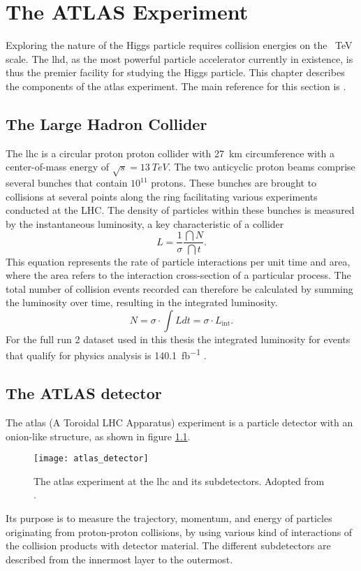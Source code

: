 \chapter{The ATLAS Experiment}\label{sec:atlas}
Exploring the nature of the Higgs particle requires collision energies on the \qty[]{}{TeV} scale. The \ac{lhd}, as the most powerful particle accelerator currently in existence, is thus the premier facility for studying the Higgs particle. This chapter describes the components of the \ac{atlas} experiment. The main reference for this section is \citep{aad2008atlas}.

\section{The Large Hadron Collider}
The \ac{lhc} is a circular proton proton collider with \qty[]{27}{km} circumference with a center-of-mass energy of $\sqrt{s}=\qty[]{13}{TeV}$. The two anticyclic proton beams comprise several bunches that contain $10^{11}$ protons. These bunches are brought to collisions at several points along the ring facilitating various experiments conducted at the LHC. The density of particles within these bunches is measured by the instantaneous luminosity, a key characteristic of a collider
\begin{equation}
    L=\frac{1}{\sigma}\frac{\dint{N}}{\dint{t}}.
\end{equation}
This equation represents the rate of particle interactions per unit time and area, where the area refers to the interaction cross-section of a particular process. The total number of collision events recorded can therefore be calculated by summing the luminosity over time, resulting in the integrated luminosity.
\begin{equation}
    N=\sigma\cdot\int L dt=\sigma\cdot L_\mathrm{int}.
\end{equation}
For the full run 2 dataset used in this thesis the integrated luminosity for events that qualify for physics analysis is \qty[]{140.1}{fb^{-1}} \citep{DAPR-2021-01}.

\section{The ATLAS detector}
The \ac{atlas} (A Toroidal LHC Apparatus) experiment is a particle detector with an onion-like structure, as shown in figure \ref{fig:atlas_detector}.
\begin{figure}
    \centering
    \texttt{[image: atlas\_detector]}
    \caption[]{The \ac{atlas} experiment at the \ac{lhc} and its subdetectors. Adopted from \citep{Pequenao:1095924}.}
    \label{fig:atlas_detector}
\end{figure}
Its purpose is to measure the trajectory, momentum, and energy of particles originating from proton-proton collisions, by using various kind of interactions of the collision products with detector material. The different subdetectors are described from the innermost layer to the outermost.

